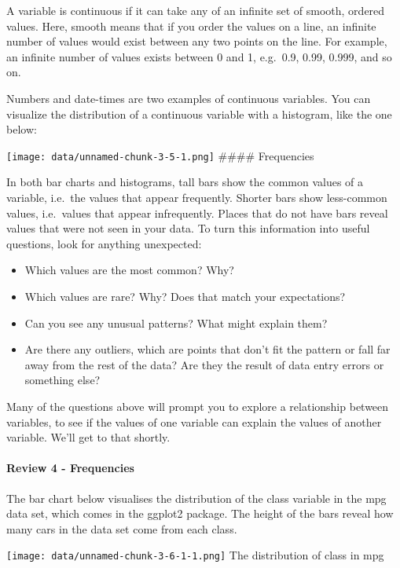 \documentclass[
]{article}
\providecommand{\tightlist}{%
  \setlength{\itemsep}{0pt}\setlength{\parskip}{0pt}}
\begin{document}
A variable is continuous if it can take any of an infinite set of
smooth, ordered values. Here, smooth means that if you order the values
on a line, an infinite number of values would exist between any two
points on the line. For example, an infinite number of values exists
between 0 and 1, e.g.~0.9, 0.99, 0.999, and so on.

Numbers and date-times are two examples of continuous variables. You can
visualize the distribution of a continuous variable with a histogram,
like the one below:

\texttt{[image: data/unnamed-chunk-3-5-1.png]} \#\#\#\# Frequencies

In both bar charts and histograms, tall bars show the common values of a
variable, i.e.~the values that appear frequently. Shorter bars show
less-common values, i.e.~values that appear infrequently. Places that do
not have bars reveal values that were not seen in your data. To turn
this information into useful questions, look for anything unexpected:

\begin{itemize}
\tightlist
\item
  Which values are the most common? Why?
\item
  Which values are rare? Why? Does that match your expectations?
\item
  Can you see any unusual patterns? What might explain them?
\item
  Are there any outliers, which are points that don't fit the pattern or
  fall far away from the rest of the data? Are they the result of data
  entry errors or something else?
\end{itemize}

Many of the questions above will prompt you to explore a relationship
between variables, to see if the values of one variable can explain the
values of another variable. We'll get to that shortly.

\hypertarget{review-4---frequencies}{%
\paragraph{Review 4 - Frequencies}\label{review-4---frequencies}}

The bar chart below visualises the distribution of the class variable in
the mpg data set, which comes in the ggplot2 package. The height of the
bars reveal how many cars in the data set come from each class.

\texttt{[image: data/unnamed-chunk-3-6-1-1.png]} The distribution of
class in mpg
\end{document}
